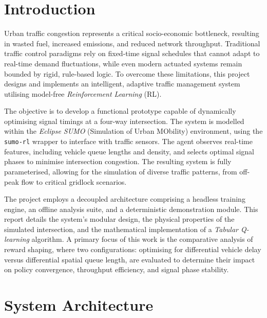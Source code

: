 \documentclass[12pt]{article}
\begin{document}


\tableofcontents

\newpage
{}
{}
\section*{Introduction}

Urban traffic congestion represents a critical socio-economic bottleneck, resulting in wasted fuel, increased emissions, and reduced network throughput. Traditional traffic control paradigms rely on fixed-time signal schedules that cannot adapt to real-time demand fluctuations, while even modern actuated systems remain bounded by rigid, rule-based logic. To overcome these limitations, this project designs and implements an intelligent, adaptive traffic management system utilising model-free \emph{Reinforcement Learning} (RL).

The objective is to develop a functional prototype capable of dynamically optimising signal timings at a four-way intersection. The system is modelled within the \emph{Eclipse SUMO} (Simulation of Urban MObility) environment, using the \texttt{sumo-rl} wrapper to interface with traffic sensors. The agent observes real-time features, including vehicle queue lengths and density, and selects optimal signal phases to minimise intersection congestion. The resulting system is fully parameterised, allowing for the simulation of diverse traffic patterns, from off-peak flow to critical gridlock scenarios.

The project employs a decoupled architecture comprising a headless training engine, an offline analysis suite, and a deterministic demonstration module. This report details the system's modular design, the physical properties of the simulated intersection, and the mathematical implementation of a \emph{Tabular Q-learning} algorithm. A primary focus of this work is the comparative analysis of reward shaping, where two configurations: optimising for differential vehicle delay versus differential spatial queue length, are evaluated to determine their impact on policy convergence, throughput efficiency, and signal phase stability.

\section{System Architecture}
\end{document}

